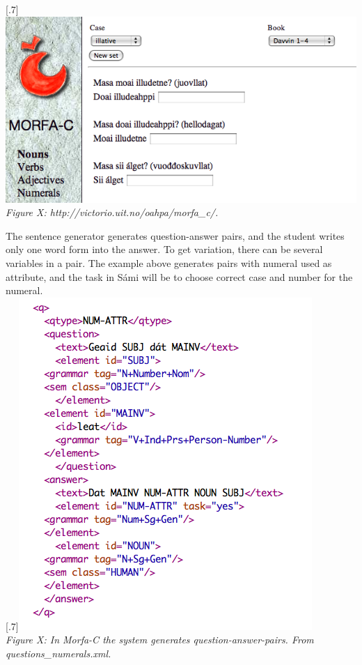 \documentclass[a4paper,12pt]{article}
\begin{document}
\scalebox{.7}[.7]{\includegraphics{img/morfaC.png}}\\
\textit{Figure X: http://victorio.uit.no/oahpa/morfa\_c/.} 

\vspace{0.5cm}

The sentence generator generates question-answer pairs, and the student writes only one word form into the answer. To get variation, there can be several variables in a pair. The example above generates pairs with numeral used as attribute, and the task in Sámi will be to choose correct case and number for the numeral.\\  


\scalebox{.7}[.7]{\includegraphics{img/morfa_question.png}}\\
\textit{Figure X: In Morfa-C the system generates question-answer-pairs. From questions\_numerals.xml.}\\
\end{document}

